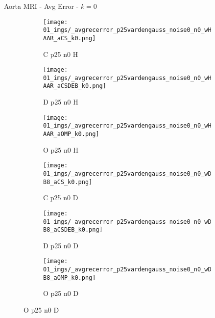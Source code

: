 \begin{frame}{Aorta MRI - Avg Error - $k=0$}{}
\begin{figure}
\begin{subfigure}{0.13\textwidth}
\texttt{[image: 01\_imgs/\_avgrecerror\_p25vardengauss\_noise0\_n0\_wHAAR\_aCS\_k0.png]}
\caption*{\tiny C p25 n0 H}
\end{subfigure}
\begin{subfigure}{0.13\textwidth}
\texttt{[image: 01\_imgs/\_avgrecerror\_p25vardengauss\_noise0\_n0\_wHAAR\_aCSDEB\_k0.png]}
\caption*{\tiny D p25 n0 H}
\end{subfigure}
\begin{subfigure}{0.13\textwidth}
\texttt{[image: 01\_imgs/\_avgrecerror\_p25vardengauss\_noise0\_n0\_wHAAR\_aOMP\_k0.png]}
\caption*{\tiny O p25 n0 H}
\end{subfigure}
\begin{subfigure}{0.13\textwidth}
\texttt{[image: 01\_imgs/\_avgrecerror\_p25vardengauss\_noise0\_n0\_wDB8\_aCS\_k0.png]}
\caption*{\tiny C p25 n0 D}
\end{subfigure}
\begin{subfigure}{0.13\textwidth}
\texttt{[image: 01\_imgs/\_avgrecerror\_p25vardengauss\_noise0\_n0\_wDB8\_aCSDEB\_k0.png]}
\caption*{\tiny D p25 n0 D}
\end{subfigure}
\begin{subfigure}{0.13\textwidth}
\texttt{[image: 01\_imgs/\_avgrecerror\_p25vardengauss\_noise0\_n0\_wDB8\_aOMP\_k0.png]}
\caption*{\tiny O p25 n0 D}
\end{subfigure}

\vspace{5pt}


\end{figure}
\end{frame}
